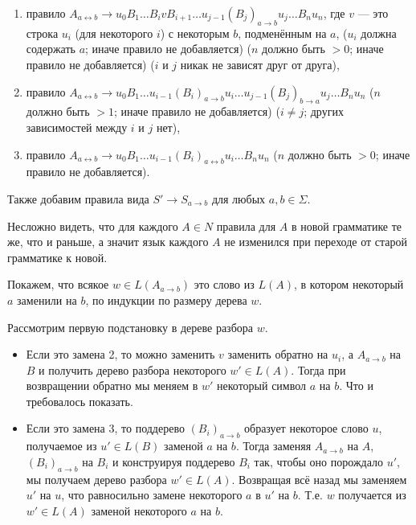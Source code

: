 \documentclass[12pt,a4paper]{article}
\begin{document}
\begin{problem}{4}
\begin{itemize}
\begin{enumerate}
                    \item правило $A_{a \leftrightarrow b} \to u_0 B_1 \dots B_i v B_{i+1} \dots u_{j-1} (B_j)_{a \to b} u_j \dots B_n u_n$, где $v$ --- это строка $u_i$ (для некоторого $i$) с некоторым $b$, подменённым на $a$, ($u_i$ должна содержать $a$; иначе правило не добавляется) ($n$ должно быть $>0$; иначе правило не добавляется) ($i$ и $j$ никак не зависят друг от друга),
                    \item правило $A_{a \leftrightarrow b} \to u_0 B_1 \dots u_{i-1} (B_i)_{a \to b} u_i \dots u_{j-1} (B_j)_{b \to a} u_j \dots B_n u_n$ ($n$ должно быть $>1$; иначе правило не добавляется) ($i \neq j$; других зависимостей между $i$ и $j$ нет),
                    \item правило $A_{a \leftrightarrow b} \to u_0 B_1 \dots u_{i-1} (B_i)_{a \leftrightarrow b} u_i \dots B_n u_n$ ($n$ должно быть $>0$; иначе правило не добавляется).
                \end{enumerate}
                Также добавим правила вида $S' \to S_{a \to b}$ для любых $a, b \in \Sigma$.
        \end{itemize}

        Несложно видеть, что для каждого $A \in N$ правила для $A$ в новой грамматике те же, что и раньше, а значит язык каждого $A$ не изменился при переходе от старой грамматике к новой.

        Покажем, что всякое $w \in L(A_{a \to b})$ это слово из $L(A)$, в котором некоторый $a$ заменили на $b$, по индукции по размеру дерева $w$.

        Рассмотрим первую подстановку в дереве разбора $w$.
        \begin{itemize}
            \item Если это замена 2, то можно заменить $v$ заменить обратно на $u_i$, а $A_{a \to b}$ на $B$ и получить дерево разбора некоторого $w' \in L(A)$. Тогда при возвращении обратно мы меняем в $w'$ некоторый символ $a$ на $b$. Что и требовалось показать.
            \item Если это замена 3, то поддерево $(B_i)_{a \to b}$ образует некоторое слово $u$, получаемое из $u' \in L(B)$ заменой $a$ на $b$. Тогда заменяя $A_{a \to b}$ на $A$, $(B_i)_{a \to b}$ на $B_i$ и конструируя поддерево $B_i$ так, чтобы оно порождало $u'$, мы получаем дерево разбора $w' \in L(A)$. Возвращая всё назад мы заменяем $u'$ на $u$, что равносильно замене некоторого $a$ в $u'$ на $b$. Т.е. $w$ получается из $w' \in L(A)$ заменой некоторого $a$ на $b$.
        \end{itemize}


\end{problem}
\end{document}
